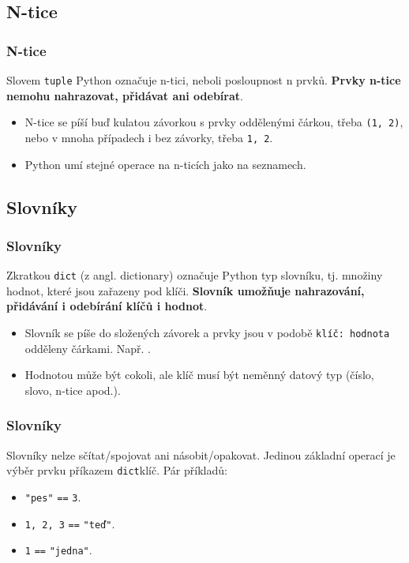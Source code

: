 \subsection[N-tice]{N-tice}

\begin{frame}
 \frametitle{N-tice}
 \begin{tcolorbox}[title=Datový typ \texttt{tuple}]
  Slovem \texttt{\alert{tuple}} Python označuje n-tici, neboli posloupnost n
  prvků. \textbf{Prvky n-tice nemohu nahrazovat, přidávat ani odebírat}.
 \end{tcolorbox}
 \begin{itemize}
  \item<2-> N-tice se píší buď kulatou závorkou s prvky oddělenými čárkou, třeba
   \texttt{(1, 2)}, nebo v mnoha případech i bez závorky, třeba \texttt{1, 2}.
  \item<3-> Python umí stejné operace na n-ticích jako na seznamech.
 \end{itemize}
\end{frame}

\subsection[Slovníky]{Slovníky}

\begin{frame}
 \frametitle{Slovníky}
 \begin{tcolorbox}[title=Datový typ \texttt{dict}]
  Zkratkou \texttt{\alert{dict}} (z angl. \alert{dict}ionary) označuje Python
  typ slovníku, tj. množiny hodnot, které jsou zařazeny pod klíči.
  \textbf{Slovník umožňuje nahrazování, přidávání i odebírání klíčů i hodnot}.
 \end{tcolorbox}
 \begin{itemize}
  \item<2-> Slovník se píše do složených závorek \texttt{\string{\string}} a
   prvky jsou v podobě \texttt{klíč: hodnota} odděleny čárkami. Např.
   \texttt{}.
  \item<3-> Hodnotou může být cokoli, ale klíč musí být \alert{neměnný datový
   typ} (číslo, slovo, n-tice apod.).
 \end{itemize}
\end{frame}

\begin{frame}
 \frametitle{Slovníky}
 Slovníky nelze sčítat/spojovat ani násobit/opakovat. Jedinou základní operací
 je výběr prvku příkazem \texttt{dict\mlb{[}}klíč\texttt{\mlb{]}}. Pár příkladů:
 \begin{itemize}
  \item<2-> \texttt{\mlb{[}"pes"\mlb{]}} \texttt{==} \texttt{3}.
  \item<3-> \texttt{\mlb{[}\mlg{(}1, 2, 3\mlg{)}\mlb{]}} \texttt{==} \texttt{"teď"}.
  \item<4-> \texttt{\mlb{[}1\mlb{]}} \texttt{==} \texttt{"jedna"}.
 \end{itemize}
\end{frame}

